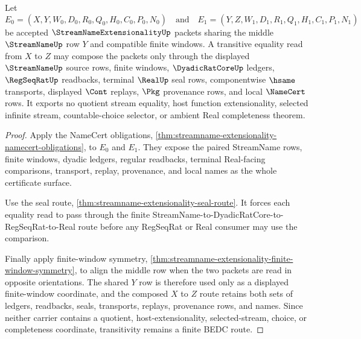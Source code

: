 \begin{theorem}
\label{thm:streamname-extensionality-transitive-window-route}
Let
$$
E_0=(X,Y,W_0,D_0,R_0,Q_0,H_0,C_0,P_0,N_0)
\quad\text{and}\quad
E_1=(Y,Z,W_1,D_1,R_1,Q_1,H_1,C_1,P_1,N_1)
$$
be accepted $\StreamNameExtensionalityUp$ packets sharing the middle $\StreamNameUp$ row $Y$ and compatible finite windows. A transitive equality read from $X$ to $Z$ may compose the packets only through the displayed $\StreamNameUp$ source rows, finite windows, $\DyadicRatCoreUp$ ledgers, $\RegSeqRatUp$ readbacks, terminal $\RealUp$ seal rows, componentwise $\hsame$ transports, displayed $\Cont$ replays, $\Pkg$ provenance rows, and local $\NameCert$ rows. It exports no quotient stream equality, host function extensionality, selected infinite stream, countable-choice selector, or ambient Real completeness theorem.
\end{theorem}
\begin{proof}
Apply the NameCert obligations, \autoref{thm:streamname-extensionality-namecert-obligations}, to $E_0$ and $E_1$. They expose the paired StreamName rows, finite windows, dyadic ledgers, regular readbacks, terminal Real-facing comparisons, transport, replay, provenance, and local names as the whole certificate surface.

Use the seal route, \autoref{thm:streamname-extensionality-seal-route}. It forces each equality read to pass through the finite StreamName-to-DyadicRatCore-to-RegSeqRat-to-Real route before any RegSeqRat or Real consumer may use the comparison.

Finally apply finite-window symmetry, \autoref{thm:streamname-extensionality-finite-window-symmetry}, to align the middle row when the two packets are read in opposite orientations. The shared $Y$ row is therefore used only as a displayed finite-window coordinate, and the composed $X$ to $Z$ route retains both sets of ledgers, readbacks, seals, transports, replays, provenance rows, and names. Since neither carrier contains a quotient, host-extensionality, selected-stream, choice, or completeness coordinate, transitivity remains a finite BEDC route.
\end{proof}


